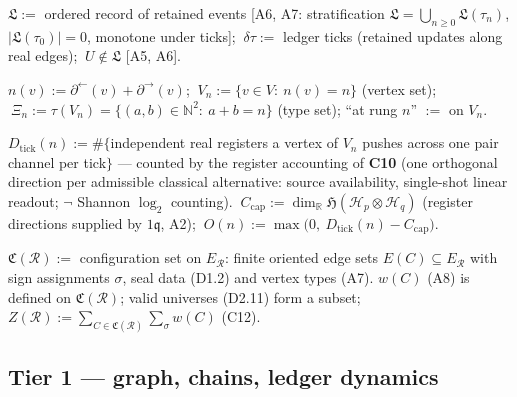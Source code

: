 \begin{definition}[{\texorpdfstring{D0.7}{D0.7}}]\label{tag:D0-7}
$\mathfrak L:=$ ordered record of retained events [A6, A7: stratification $\mathfrak L=\bigcup_{n\ge0}\mathfrak L(\tau_n)$, $|\mathfrak L(\tau_0)|=0$, monotone under ticks]; $\ \delta\tau:=$ ledger ticks (retained updates along real edges); $\ U\notin\mathfrak L$ [A5, A6].

\end{definition}

\begin{definition}[{\texorpdfstring{D0.8}{D0.8}}]\label{tag:D0-8}
$n(v):=\partial^{\leftarrow}(v)+\partial^{\rightarrow}(v)$; $\ V_n:=\{v\in V:\ n(v)=n\}$ (vertex set); $\ \Xi_n:=\tau(V_n)=\{(a,b)\in\mathbb N^2:\ a+b=n\}$ (type set); “at rung $n$” $:=$ on $V_n$.

\end{definition}

\begin{definition}[{\texorpdfstring{D0.9}{D0.9}}]\label{tag:D0-9}
$D_{\mathrm{tick}}(n):=\#\{$independent real registers a vertex of $V_n$ pushes across one pair channel per tick$\}$ — counted by the register accounting of \textbf{C10} (one orthogonal direction per admissible classical alternative: source availability, single-shot linear readout; $\neg$ Shannon $\log_2$ counting). $\ C_{\mathrm{cap}}:=\dim_{\mathbb R}\mathfrak H(\mathcal H_p\otimes\mathcal H_q)$ (register directions supplied by $1\mathfrak q$, A2); $\ O(n):=\max\bigl(0,\ D_{\mathrm{tick}}(n)-C_{\mathrm{cap}}\bigr)$.

\end{definition}

\begin{definition}[{\texorpdfstring{D0.10}{D0.10}}]\label{tag:D0-10}
$\mathfrak C(\mathcal R):=$ configuration set on $E_{\mathcal R}$: finite oriented edge sets $E(C)\subseteq E_{\mathcal R}$ with sign assignments $\sigma$, seal data (D1.2) and vertex types (A7). $w(C)$ (A8) is defined on $\mathfrak C(\mathcal R)$; valid universes (D2.11) form a subset; $Z(\mathcal R):=\sum_{C\in\mathfrak C(\mathcal R)}\sum_\sigma w(C)$ (C12).

\end{definition}

\subsection[Tier 1 — graph, chains, ledger dynamics]{\texorpdfstring{Tier 1 — graph, chains, ledger dynamics}{Tier 1 - graph, chains, ledger dynamics}}

